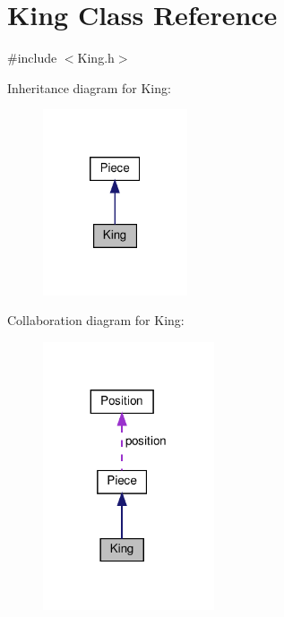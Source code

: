 \hypertarget{class_king}{}\section{King Class Reference}
\label{class_king}


{\ttfamily \#include $<$King.\+h$>$}



Inheritance diagram for King\+:\nopagebreak
\begin{figure}[H]
\begin{center}
\leavevmode
\includegraphics[width=121pt]{class_king__inherit__graph}
\end{center}
\end{figure}


Collaboration diagram for King\+:\nopagebreak
\begin{figure}[H]
\begin{center}
\leavevmode
\includegraphics[width=143pt]{class_king__coll__graph}
\end{center}
\end{figure}
